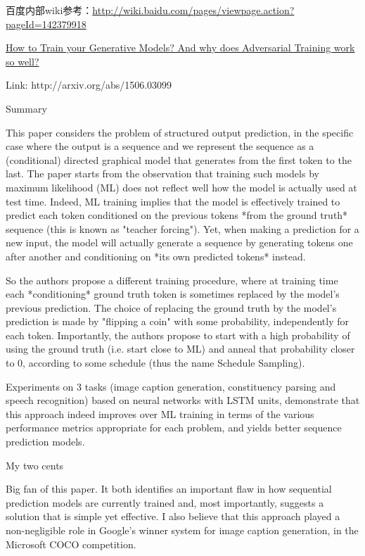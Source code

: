 \documentclass[10pt,a4paper]{ctexbook}
\begin{document}
百度内部wiki参考：\url{http://wiki.baidu.com/pages/viewpage.action?pageId=142379918}


\href{http://www.inference.vc/how-to-train-your-generative-models-why-generative-adversarial-networks-work-so-well-2/}{How to Train your Generative Models? And why does Adversarial Training work so well?}


Link: http://arxiv.org/abs/1506.03099

Summary

This paper considers the problem of structured output prediction, in the specific case where the output is a sequence and we represent the sequence as a (conditional) directed graphical model that generates from the first token to the last. The paper starts from the observation that training such models by maximum likelihood (ML) does not reflect well how the model is actually used at test time. Indeed, ML training implies that the model is effectively trained to predict each token conditioned on the previous tokens *from the ground truth* sequence (this is known as "teacher forcing"). Yet, when making a prediction for a new input, the model will actually generate a sequence by generating tokens one after another and conditioning on *its own predicted tokens* instead. 

So the authors propose a different training procedure, where at training time each *conditioning* ground truth token is sometimes replaced by the model's previous prediction. The choice of replacing the ground truth by the model's prediction is made by "flipping a coin" with some probability, independently for each token. Importantly, the authors propose to start with a high probability of using the ground truth (i.e. start close to ML) and anneal that probability closer to 0, according to some schedule (thus the name Schedule Sampling). 

Experiments on 3 tasks (image caption generation, constituency parsing and speech recognition) based on neural networks with LSTM units, demonstrate that this approach indeed improves over ML training in terms of the various performance metrics appropriate for each problem, and yields better sequence prediction models. 



My two cents

Big fan of this paper. It both identifies an important flaw in how sequential prediction models are currently trained and, most importantly, suggests a solution that is simple yet effective. I also believe that this approach played a non-negligible role in Google's winner system for image caption generation, in the Microsoft COCO competition. 
\end{document}
